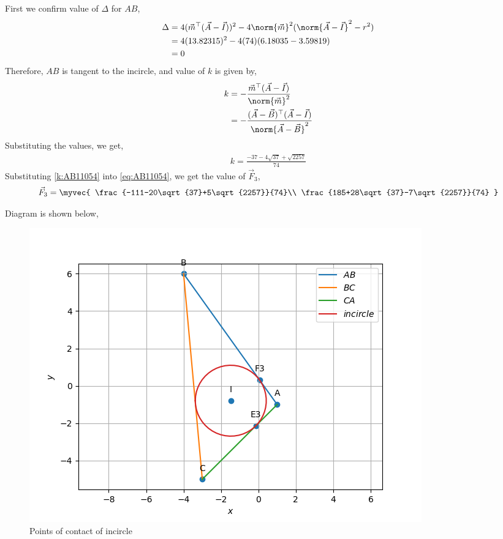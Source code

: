 \documentclass[journal,12pt,twocolumn]{IEEEtran}
\theoremstyle{remark}
\begin{document}
\begin{enumerate}
		First we confirm value of $\Delta$ for $AB$,
		\begin{align}
			\Delta &= 4(\vec{m}^{\top}(\vec{A}-\vec{I}))^2 - 4\norm{\vec{m}}^2(\norm{\vec{A}-\vec{I}}^2 - r^2)\\	
			&= 4(13.82315)^2 - 4(74)(6.18035-3.59819) \\
			&= 0
		\end{align}
		Therefore, $AB$ is tangent to the incircle, and value of $k$ is given by, 
		\begin{align}
			k &= -\frac{\vec{m}^{\top}(\vec{A} - \vec{I})}{\norm{\vec{m}}^2} \\
			&= -\frac{(\vec{A}-\vec{B})^{\top}(\vec{A} - \vec{I})}{\norm{\vec{A}-\vec{B}}^2}
		\end{align}
		Substituting the values, we get,
		\begin{align}
			k = \frac{-37-4\sqrt{37}+\sqrt{2257}}{74} \label{k:AB11054} 
		\end{align}
		Substituting \eqref{k:AB11054} into \eqref{eq:AB11054}, we get the value of $\vec{F}_3$,
		\begin{align}
			\vec{F}_3 = \myvec{
				\frac{-111-20\sqrt{37}+5\sqrt{2257}}{74}\\ 
				\frac{185+28\sqrt{37}-7\sqrt{2257}}{74}
			}
		\end{align}
\end{enumerate}
Diagram is shown below,
\begin{figure}[h]
	\centering
	\includegraphics[width=\columnwidth]{./figs/Diagram.png}
	\caption{Points of contact of incircle}
	\label{fig:Incircle11054}
\end{figure}
\end{document}
